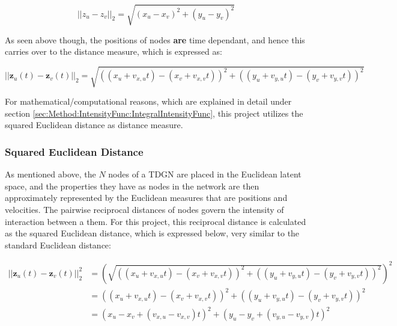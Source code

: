 \begin{equation}
    ||z_u - z_v||_2
    = 
    \sqrt{(x_u - x_v)^2 + (y_u - y_v)^2}
\end{equation}

As seen above though, the positions of nodes \textbf{are} time dependant, and hence this carries over to the distance measure, which is expressed as:

\begin{equation}
    ||\textbf{z}_u(t) - \textbf{z}_v(t)||_2
    = 
    \sqrt{((x_u + v_{x,u}t) - (x_v + v_{x,v}t))^2 + ((y_u + v_{y,u}t) - (y_v + v_{y,v}t))^2}
\end{equation}

For mathematical/computational reasons, which are explained in detail under section \ref{sec:Method:IntensityFunc:IntegralIntensityFunc}, this project utilizes the squared Euclidean distance as distance measure.


\subsubsection{Squared Euclidean Distance}
\label{sec:Method:LSM:SquaredEuclideanDistance}

As mentioned above, the $N$ nodes of a TDGN are placed in the Euclidean latent space, and the properties they have as nodes in the network are then approximately represented by the Euclidean measures that are positions and velocities.
The pairwise reciprocal distances of nodes govern the intensity of interaction between a them.
For this project, this reciprocal distance is calculated as the squared Euclidean distance, which is expressed below, very similar to the standard Euclidean distance:

\begin{align} 
||\textbf{z}_u(t) - \textbf{z}_v(t)||_2^2
&= 
\left(\sqrt{((x_u + v_{x,u}t) - (x_v + v_{x,v}t))^2 + ((y_u + v_{y,u}t) - (y_v + v_{y,v}t))^2}\right)^2
\\
&=
((x_u + v_{x,u}t) - (x_v + v_{x,v}t))^2 + ((y_u + v_{y,u}t) - (y_v + v_{y,v}t))^2
\\
&=
(x_u - x_v + (v_{x,u} - v_{x,v})t)^2 + (y_u - y_v + ( v_{y,u} - v_{y,v})t)^2
\label{eq:SquaredEuclideanDistance}
\end{align}


